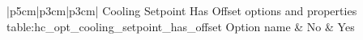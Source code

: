 \begin{customLongTable}{ |p{5cm}|p{3cm}|p{3cm}| }
{Cooling Setpoint Has Offset options and properties} {table:hc_opt_cooling_setpoint_has_offset}
{Option name & No & Yes}
\endhead
\hline
\end{customLongTable}
